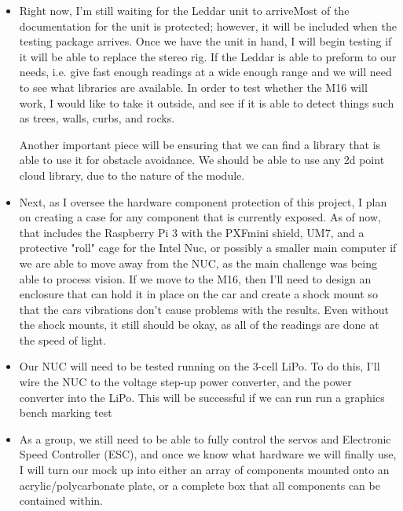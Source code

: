 \documentclass[compsoc,draftclsnofoot,onecolumn,10pt]{IEEEtran}
\begin{document}
		\begin{itemize}
				\item Right now, I'm still waiting for the Leddar unit to arriveMost of the documentation for the unit is protected; however, it will be included when the testing package arrives. 
					Once we have the unit in hand, I will begin testing if it will be able to replace the stereo rig. 
					If the Leddar is able to preform to our needs, i.e. give fast enough readings at a wide enough range and we will need to see what libraries are available. 
					In order to test whether the M16 will work, I would like to take it outside, and see if it is able to detect things such as trees, walls, curbs, and rocks.
					
					Another important piece will be ensuring that we can find a library that is able to use it for obstacle avoidance. 
					We should be able to use any 2d point cloud library, due to the nature of the module.
			
				\item Next, as I oversee the hardware component protection of this project, I plan on creating a case for any component that is currently exposed. 
					As of now, that includes the Raspberry Pi 3 with the PXFmini shield, UM7, and a protective "roll" cage for the Intel Nuc, or possibly a smaller main computer if we are able to move away from the NUC, as the main challenge was being able to process vision. 
					If we move to the M16, then I'll need to design an enclosure that can hold it in place on the car and create a shock mount so that the cars vibrations don't cause problems with the results. 
					Even without the shock mounts, it still should be okay, as all of the readings are done at the speed of light. 
					
				\item Our NUC will need to be tested running on the 3-cell LiPo. To do this, I'll wire the NUC to the voltage step-up power converter, and the power converter into the LiPo. 
					This will be successful if we can run run a graphics bench marking test 
		
				\item As a group, we still need to be able to fully control the servos and Electronic Speed Controller (ESC), and once we know what hardware we will finally use, I will turn our mock up into either an array of components mounted onto an acrylic/polycarbonate plate, or a complete box that all components can be contained within. 
		\end{itemize}
		
\end{document}

